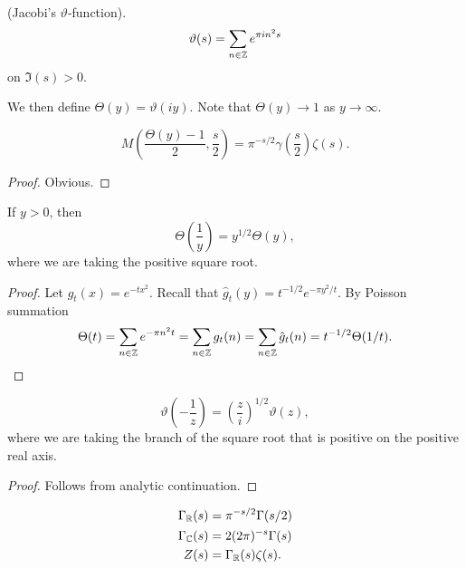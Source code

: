 \documentclass{memoir}
\begin{document}
\begin{definition}
    (Jacobi's $\vartheta$-function).
    \begin{equation}
        \vartheta(s) = \sum_{n\in\mathbb{Z}}e^{\pi i n^2 s}
    \end{equation}
    on $\Im(s)>0$.
\end{definition}
We then define $\Theta(y) = \vartheta(iy)$.
Note that $\Theta(y)\to1$ as $y\to\infty$.
\begin{proposition}
    \begin{equation}
        M\left(\frac{\Theta(y)-1}2,\frac s2\right) = \pi^{-s/2}\gamma\left(\frac s2\right)\zeta(s).
    \end{equation}
\end{proposition}
\begin{proof}
    Obvious.
\end{proof}
\begin{thm}
    If $y>0$, then 
    \begin{equation}
        \Theta\left(\frac 1y\right) = y^{1/2}\Theta(y),
    \end{equation}
    where we are taking the positive square root.
\end{thm}
\begin{proof}
    Let $g_t(x) = e^{-tx^2}$.
    Recall that $\hat g_t(y) = t^{-1/2} e^{-\pi y^2/t}$.
    By Poisson summation 
    \begin{equation}
        \Theta(t) = \sum_{n\in \mathbb{Z}}e^{-\pi n^2t} = \sum_{n\in \mathbb{Z}}g_t(n) = \sum_{n\in\mathbb{Z}}\hat g_t(n) = t^{-1/2}\Theta(1/t).
    \end{equation}
\end{proof}
\begin{corollary}
    \begin{equation}
        \vartheta\left(-\frac 1z\right) = \left(\frac zi\right)^{1/2}\vartheta(z),
    \end{equation}
    where we are taking the branch of the square root that is positive on the positive real axis.
\end{corollary}
\begin{proof}
    Follows from analytic continuation.
\end{proof}
\begin{notation}
    \begin{align}
        \Gamma_{\mathbb{R}}(s) &= \pi^{-s/2}\Gamma(s/2) \\
        \Gamma_{\mathbb{C}}(s) &= 2(2\pi)^{-s}\Gamma(s) \\
        Z(s) &= \Gamma_{\mathbb{R}}(s)\zeta(s).
    \end{align}
\end{notation}
\end{document}
